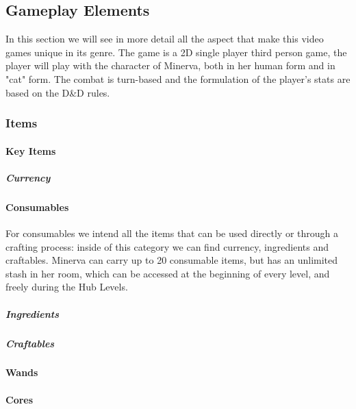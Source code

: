 \subsection{Gameplay Elements}

In this section we will see in more detail all the aspect that make this video games unique in its genre. The game is a 2D single player third person game, the player will play with the character of Minerva, both in her human form and in "cat" form. The combat is turn-based and the formulation of the player's stats are based on the D\&D rules.



\subsubsection{Items}

\paragraph{Key Items}


\subparagraph{Currency}


\pagebreak
\paragraph{Consumables}
For consumables we intend all the items that can be used directly or through a crafting process: inside of this category we can find currency, ingredients and craftables. Minerva can carry up to 20 consumable items, but has an unlimited stash in her room, which can be accessed at the beginning of every level, and freely during the Hub Levels. 

\subparagraph{Ingredients}


\subparagraph{Craftables}


\paragraph{Wands}


\paragraph{Cores}



